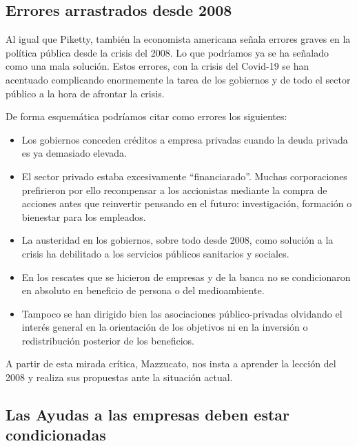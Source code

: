 \documentclass[
]{article}
\begin{document}
\hypertarget{errores-arrastrados-desde-2008}{%
\subsection{Errores arrastrados desde
2008}\label{errores-arrastrados-desde-2008}}

Al igual que Piketty, también la economista americana señala errores
graves en la política pública desde la crisis del 2008. Lo que podríamos
ya se ha señalado como una mala solución. Estos errores, con la crisis
del Covid-19 se han acentuado complicando enormemente la tarea de los
gobiernos y de todo el sector público a la hora de afrontar la crisis.

De forma esquemática podríamos citar como errores los siguientes:

\begin{itemize}
\item
  Los gobiernos conceden créditos a empresa privadas cuando la deuda
  privada es ya demasiado elevada.
\item
  El sector privado estaba excesivamente ``financiarado''. Muchas
  corporaciones prefirieron por ello recompensar a los accionistas
  mediante la compra de acciones antes que reinvertir pensando en el
  futuro: investigación, formación o bienestar para los empleados.
\item
  La austeridad en los gobiernos, sobre todo desde 2008, como solución a
  la crisis ha debilitado a los servicios públicos sanitarios y
  sociales.
\item
  En los rescates que se hicieron de empresas y de la banca no se
  condicionaron en absoluto en beneficio de persona o del medioambiente.
\item
  Tampoco se han dirigido bien las asociaciones público-privadas
  olvidando el interés general en la orientación de los objetivos ni en
  la inversión o redistribución posterior de los beneficios.
\end{itemize}

A partir de esta mirada crítica, Mazzucato, nos insta a aprender la
lección del 2008 y realiza sus propuestas ante la situación actual.

\hypertarget{las-ayudas-a-las-empresas-deben-estar-condicionadas}{%
\subsection{Las Ayudas a las empresas deben estar
condicionadas}\label{las-ayudas-a-las-empresas-deben-estar-condicionadas}}
\end{document}
